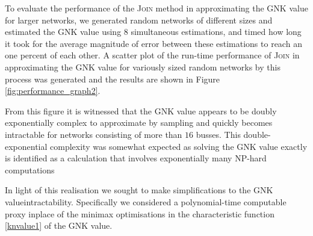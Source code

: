 To evaluate the performance of the \textsc{Join} method in approximating the GNK value for larger networks, we generated random networks of different sizes \DIFaddbegin {}\DIFaddend and estimated the GNK value using 8 simultaneous estimations, and timed how long it took for the average magnitude of error between these estimations to reach an one percent of each other.
A scatter plot of the run-time performance of \textsc{Join} in approximating the GNK value for variously sized random networks by this process was generated and the results are shown in Figure \ref{fig:performance_graph2}.


From this figure it is witnessed that the GNK value appears to be doubly exponentially complex to approximate by sampling and quickly becomes intractable for networks consisting of more than $16$ busses.
This double-exponential complexity was somewhat expected as solving the GNK value exactly is identified as a calculation that involves exponentially many \DIFaddbegin {}\DIFaddend NP-hard computations \DIFdelbegin {}%

\DIFdelend \DIFaddbegin {}\DIFaddend In light of this realisation we sought to make simplifications to the GNK value\DIFdelbegin {}\DIFdelend \DIFaddbegin {}\DIFaddend intractability.
Specifically we considered a polynomial-time computable proxy inplace of the minimax optimisations in the characteristic function \eqref{knvalue1} of the GNK value.


\iffigures
\DIFdelbegin %

\DIFdelend 
\fi

\DIFdelbegin \subsection{}%
\addtocounter{subsection}{-1}%
\DIFdelend %
\DIFaddbegin \section{}\DIFaddend \label{sec:modified_gnk}

